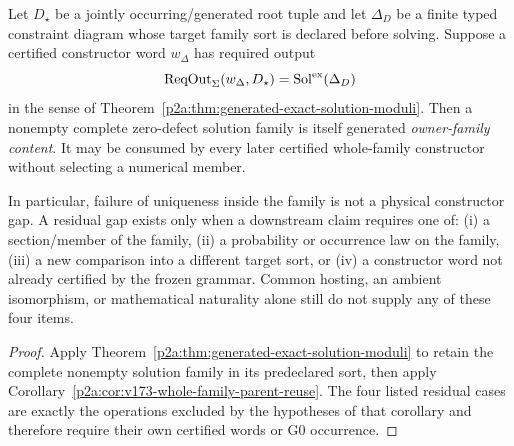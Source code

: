 \documentclass[12pt,a4paper]{article}
\begin{document}
\begin{corollary}
\label{p2a:cor:v186-generated-constrained-owner-family}
Let $D_\star$ be a jointly occurring/generated root tuple and let
$\Delta_D$ be a finite typed constraint diagram whose target family sort is
declared before solving.  Suppose a certified constructor word
$w_\Delta$ has required output
\[
 \operatorname{ReqOut}_{\Sigma}(w_\Delta,D_\star)
 =\operatorname{Sol}^{\rm ex}(\Delta_D)
\]
in the sense of Theorem~\ref{p2a:thm:generated-exact-solution-moduli}.  Then a
nonempty complete zero-defect solution family is itself generated
\emph{owner-family content}.  It may be consumed by every later certified
whole-family constructor without selecting a numerical member.

In particular, failure of uniqueness inside the family is not a physical
constructor gap.  A residual gap exists only when a downstream claim requires
one of: (i) a section/member of the family, (ii) a probability or occurrence
law on the family, (iii) a new comparison into a different target sort, or
(iv) a constructor word not already certified by the frozen grammar.  Common
hosting, an ambient isomorphism, or mathematical naturality alone still do
not supply any of these four items.
\end{corollary}
\begin{proof}
Apply Theorem~\ref{p2a:thm:generated-exact-solution-moduli} to retain the
complete nonempty solution family in its predeclared sort, then apply
Corollary~\ref{p2a:cor:v173-whole-family-parent-reuse}.  The four listed
residual cases are exactly the operations excluded by the hypotheses of that
corollary and therefore require their own certified words or G0 occurrence.
\end{proof}
\end{document}
